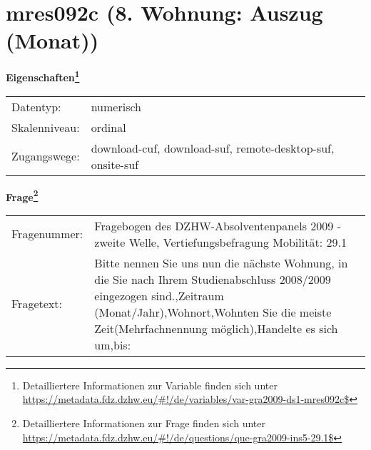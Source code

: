 
    \setcounter{footnote}{0}

    \vspace*{-1.8cm}
	\section{mres092c (8. Wohnung: Auszug (Monat))}
	\label{section:mres092c}



    \vspace*{0.5cm}
    \noindent\textbf{Eigenschaften\footnote{Detailliertere Informationen zur Variable finden sich unter
		\url{https://metadata.fdz.dzhw.eu/\#!/de/variables/var-gra2009-ds1-mres092c$}}}\\
	\begin{tabularx}{\hsize}{@{}lX}
	Datentyp: & numerisch \\
	Skalenniveau: & ordinal \\
	Zugangswege: &
	  download-cuf, 
	  download-suf, 
	  remote-desktop-suf, 
	  onsite-suf
 \\
    \end{tabularx}



				\vspace*{0.5cm}
                \noindent\textbf{Frage\footnote{Detailliertere Informationen zur Frage finden sich unter
		              \url{https://metadata.fdz.dzhw.eu/\#!/de/questions/que-gra2009-ins5-29.1$}}}\\
				\begin{tabularx}{\hsize}{@{}lX}
					Fragenummer: &
					  Fragebogen des DZHW-Absolventenpanels 2009 - zweite Welle, Vertiefungsbefragung Mobilität:
					  29.1
 \\
					Fragetext: & Bitte nennen Sie uns nun die nächste Wohnung, in die Sie nach Ihrem Studienabschluss 2008/2009 eingezogen sind.,Zeitraum (Monat/Jahr),Wohnort,Wohnten Sie die meiste Zeit(Mehrfachnennung möglich),Handelte es sich um,bis: \\
				\end{tabularx}





